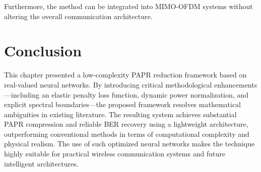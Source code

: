 Furthermore, the method can be integrated into MIMO-OFDM systems without altering the overall communication architecture.

\section{Conclusion}

This chapter presented a low-complexity PAPR reduction framework based on real-valued neural networks. By introducing critical methodological enhancements—including an elastic penalty loss function, dynamic power normalization, and explicit spectral boundaries—the proposed framework resolves mathematical ambiguities in existing literature. The resulting system achieves substantial PAPR compression and reliable BER recovery using a lightweight architecture, outperforming conventional methods in terms of computational complexity and physical realism. The use of such optimized neural networks makes the technique highly suitable for practical wireless communication systems and future intelligent architectures.
